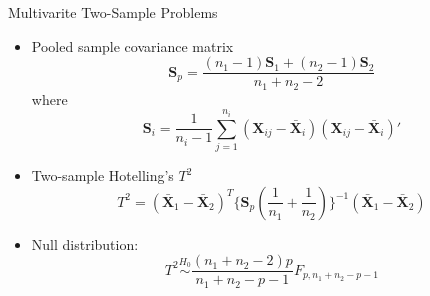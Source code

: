 \documentclass[
  ignorenonframetext,
]{beamer}
\begin{document}
\begin{frame}{Multivarite Two-Sample Problems}
\protect\hypertarget{multivarite-two-sample-problems-1}{}
\begin{itemize}
\item
  Pooled sample covariance matrix
  \[\mathbf{S}_p = \dfrac{(n_1-1)\mathbf{S}_1+(n_2-1)\mathbf{S}_2}{n_1+n_2-2}\]
  where
  \[\mathbf{S}_i = \dfrac{1}{n_i-1}\sum_{j=1}^{n_i}{(\mathbf X_{ij}-\bar{\mathbf X}_i)(\mathbf X_{ij}-\bar{\mathbf X}_i)'}\]
\item
  Two-sample Hotelling's \(T^2\)
  \[T^2 = {(\bar{\mathbf X}_1 - \bar{\mathbf X}_2)}^T\{\mathbf{S}_p(\frac{1}{n_1}+\frac{1}{n_2})\}^{-1} {(\bar{\mathbf X}_1 - \bar{\mathbf X}_2)}\]
\item
  Null distribution:
  \[T^2 \overset{H_0}\sim \frac{(n_1+n_2-2)p}{n_1+n_2-p-1} F_{p, n_1+n_2-p-1}\]
\end{itemize}
\end{frame}
\end{document}
